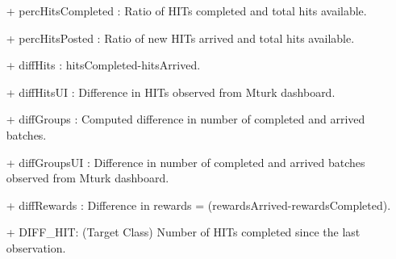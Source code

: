 \begin{itemize}[noitemsep,topsep=0pt,parsep=0pt,partopsep=0pt]
\item[+] percHitsCompleted : Ratio of HITs completed and total hits available.
\item[+] percHitsPosted : Ratio of new HITs arrived and total hits available.
\item[+] diffHits : hitsCompleted-hitsArrived.
\item[+] diffHitsUI : Difference in HITs observed from Mturk dashboard.
\item[+] diffGroups  : Computed difference in number of completed and arrived batches.
\item[+] diffGroupsUI : Difference in number of completed and arrived batches observed from Mturk dashboard.
\item[+] diffRewards : Difference in rewards = (rewardsArrived-rewardsCompleted).
\item[+] DIFF\_HIT:  (Target Class) Number of HITs completed since the last observation.
\end{itemize}
